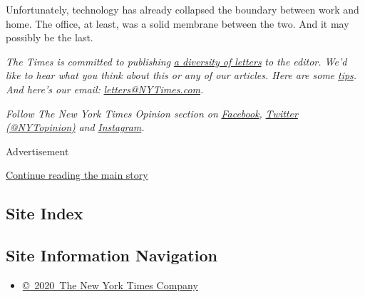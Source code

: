 Unfortunately, technology has already collapsed the boundary between
work and home. The office, at least, was a solid membrane between the
two. And it may possibly be the last.

\emph{The Times is committed to publishing}
\href{https://www.nytimes3xbfgragh.onion/2019/01/31/opinion/letters/letters-to-editor-new-york-times-women.html}{\emph{a
diversity of letters}} \emph{to the editor. We'd like to hear what you
think about this or any of our articles. Here are some}
\href{https://help.nytimes3xbfgragh.onion/hc/en-us/articles/115014925288-How-to-submit-a-letter-to-the-editor}{\emph{tips}}\emph{.
And here's our email:}
\href{mailto:letters@NYTimes.com}{\emph{letters@NYTimes.com}}\emph{.}

\emph{Follow The New York Times Opinion section on}
\href{https://www.facebookcorewwwi.onion/nytopinion}{\emph{Facebook}}\emph{,}
\href{http://twitter.com/NYTOpinion}{\emph{Twitter (@NYTopinion)}}
\emph{and}
\href{https://www.instagram.com/nytopinion/}{\emph{Instagram}}\emph{.}

Advertisement

\protect\hyperlink{after-bottom}{Continue reading the main story}

\hypertarget{site-index}{%
\subsection{Site Index}\label{site-index}}

\hypertarget{site-information-navigation}{%
\subsection{Site Information
Navigation}\label{site-information-navigation}}

\begin{itemize}
\tightlist
\item
  \href{https://help.nytimes3xbfgragh.onion/hc/en-us/articles/115014792127-Copyright-notice}{©~2020~The
  New York Times Company}
\end{itemize}

